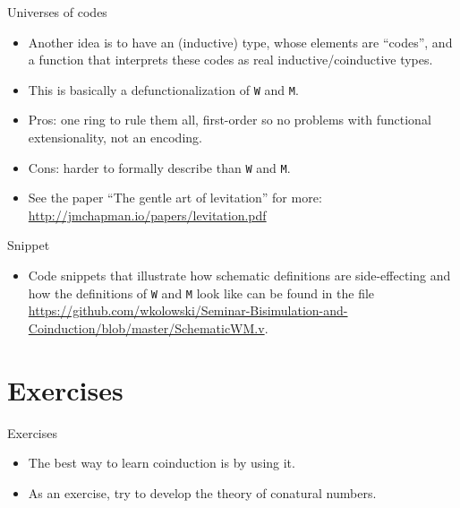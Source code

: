 \documentclass{beamer}
\begin{document}
\begin{frame}{Universes of codes}
\begin{itemize}
	\item Another idea is to have an (inductive) type, whose elements are ``codes'', and a function that interprets these codes as real inductive/coinductive types.
	\item This is basically a defunctionalization of \texttt{W} and \texttt{M}.
	\item Pros: one ring to rule them all, first-order so no problems with functional extensionality, not an encoding.
	\item Cons: harder to formally describe than \texttt{W} and \texttt{M}.
	\item See the paper ``The gentle art of levitation'' for more: \url{http://jmchapman.io/papers/levitation.pdf}
\end{itemize}
\end{frame}

\begin{frame}{Snippet}
\begin{itemize}
	\item Code snippets that illustrate how schematic definitions are side-effecting and how the definitions of \texttt{W} and \texttt{M} look like can be found in the file \url{https://github.com/wkolowski/Seminar-Bisimulation-and-Coinduction/blob/master/SchematicWM.v}.
\end{itemize}
\end{frame}

\section{Exercises}

\begin{frame}{Exercises}
\begin{itemize}
	\item The best way to learn coinduction is by using it.
	\item As an exercise, try to develop the theory of conatural numbers.
\end{itemize}
\end{frame}
\end{document}
